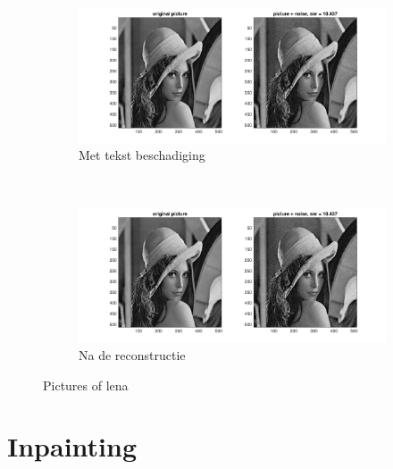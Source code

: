 \begin{figure}
    \centering
    \begin{subfigure}[b]{0.45\textwidth}
        \includegraphics[width=\textwidth]{../src/denoising/task1_4_noise}
        \caption{Met tekst beschadiging}
        \label{fig:tiger}
    \end{subfigure}
    ~ %
    \begin{subfigure}[b]{0.45\textwidth}
        \includegraphics[width=\textwidth]{../src/denoising/task1_4_noise}
        \caption{Na de reconstructie}
        \label{fig:mouse}
    \end{subfigure}
    \caption{Pictures of lena}\label{fig:animals}
\end{figure}



\section{Inpainting}

